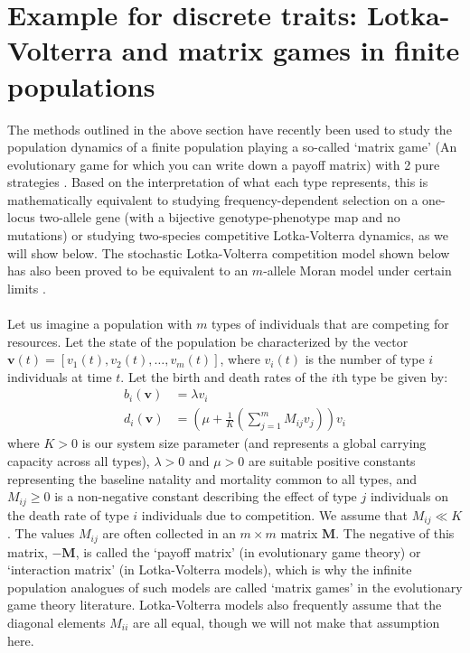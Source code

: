 
\section{Example for discrete traits: Lotka-Volterra and matrix games in finite populations}

The methods outlined in the above section have recently been used to study the population dynamics of a finite population playing a so-called `matrix game' (An evolutionary game for which you can write down a payoff matrix) with 2 pure strategies \citep{tao_stochastic_2007}. Based on the interpretation of what each type represents, this is mathematically equivalent to studying frequency-dependent selection on a one-locus two-allele gene (with a bijective genotype-phenotype map and no mutations) or studying two-species competitive Lotka-Volterra dynamics, as we will show below. The stochastic Lotka-Volterra competition model shown below has also been proved to be equivalent to an $m$-allele Moran model under certain limits \citep{constable_mapping_2017}.\\
\\
Let us imagine a population with $m$ types of individuals that are competing for resources. Let the state of the population be characterized by the vector $\mathbf{v}(t) = [v_1(t),v_2(t),\ldots,v_m(t)]$, where $v_i(t)$ is the number of type $i$ individuals at time $t$. Let the birth and death rates of the $i$th type be given by:
\begin{equation}
\label{nD_example_numbers_b_d_rates}
\begin{aligned}
b_i(\mathbf{v}) &= \lambda v_i\\
d_i(\mathbf{v}) &= \left(\mu + \frac{1}{K}\left(\sum\limits_{j=1}^{m}M_{ij}v_j\right)\right)v_i
\end{aligned}
\end{equation}
where $K > 0$ is our system size parameter (and represents a global carrying capacity across all types), $\lambda > 0$ and $\mu > 0$ are suitable positive constants representing the baseline natality and mortality common to all types, and $M_{ij} \geq 0$ is a non-negative constant describing the effect of type $j$ individuals on the death rate of type $i$ individuals due to competition. We assume that $M_{ij} \ll K$. The values $M_{ij}$ are often collected in an $m \times m$ matrix $\mathbf{M}$. The negative of this matrix, $-\mathbf{M}$, is called the `payoff matrix' (in evolutionary game theory) or `interaction matrix' (in Lotka-Volterra models), which is why the infinite population analogues of such models are called `matrix games' in the evolutionary game theory literature. Lotka-Volterra models also frequently assume that the diagonal elements $M_{ii}$ are all equal, though we will not make that assumption here.\\
